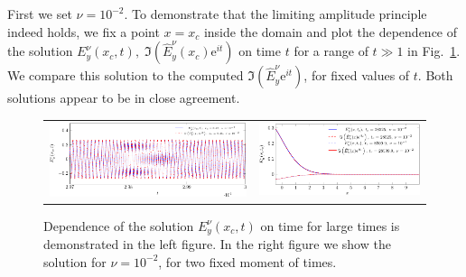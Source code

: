 First we set $\nu=10^{-2}$. To demonstrate that the limiting amplitude principle indeed holds, we fix a point $x=x_c$ 
inside the domain and plot the dependence of the solution $E_{y}^{\nu}(x_c,t), \; \Im\left(\hat{E}_y^{\nu}(x_c)\mathrm{e}^{it}\right)$ 
on time $t$ for a range of $t\gg 1$ in Fig.~\ref{fig:nu1e2_harmon}. We compare this solution to the computed $\Im\left(\hat{E}_y^{\nu}\mathrm{e}^{it}\right)$, for
fixed values of $t$. Both solutions appear to be in close agreement. 

\begin{figure}[htb]
\begin{tabular}{cc}
\includegraphics[height=0.2\textwidth]{airy/figure_nu1e2-crop.pdf} & \includegraphics[height=0.2\textwidth]{airy/figure_nu1e2_2-crop.pdf}
\end{tabular}
\caption{Dependence of the solution $E_{y}^{\nu}(x_c,t)$ on time for large times is demonstrated in the left figure.  
In the right figure we show the solution for $\nu=10^{-2}$, for two fixed moment of times.}
 \label{fig:nu1e2_harmon}
\end{figure}


